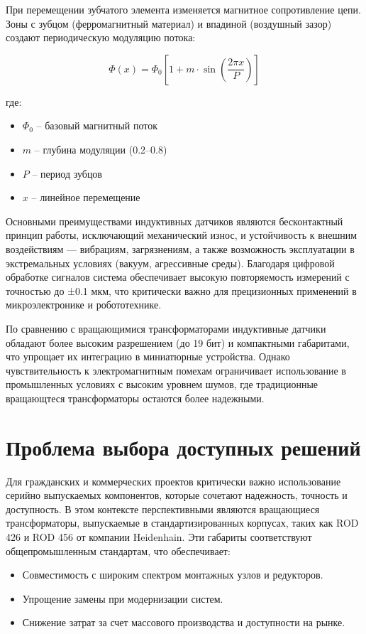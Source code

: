 При перемещении зубчатого элемента изменяется магнитное сопротивление цепи. Зоны с зубцом (ферромагнитный материал) и впадиной (воздушный зазор) создают периодическую модуляцию потока:

\begin{equation}
    \Phi(x) = \Phi_0 \left[ 1 + m \cdot \sin\left(\frac{2\pi x}{P}\right) \right]
\end{equation}

где:
\begin{itemize}
    \item $\Phi_0$ -- базовый магнитный поток
    \item $m$ -- глубина модуляции (0.2–0.8)
    \item $P$ -- период зубцов
    \item $x$ -- линейное перемещение
\end{itemize}

Основными преимуществами индуктивных датчиков являются бесконтактный принцип работы, исключающий механический износ, и устойчивость к внешним воздействиям — вибрациям, загрязнениям, 
а также возможность эксплуатации в экстремальных условиях (вакуум, агрессивные среды). Благодаря цифровой обработке сигналов система обеспечивает высокую повторяемость измерений 
с точностью до ±0.1 мкм, что критически важно для прецизионных применений в микроэлектронике и робототехнике.

По сравнению с вращающимися трансформаторами индуктивные датчики обладают более высоким разрешением (до 19 бит) и компактными габаритами, что упрощает их интеграцию в миниатюрные устройства. 
Однако  чувствительность к электромагнитным помехам ограничивает использование в промышленных условиях с высоким уровнем шумов, где традиционные вращающтеся трансформаторы 
остаются более надежными.

\section{Проблема выбора доступных решений}
Для гражданских и коммерческих проектов критически важно использование серийно выпускаемых компонентов, которые сочетают надежность, точность и доступность. 
В этом контексте перспективными являются вращающиеся трансформаторы, выпускаемые в стандартизированных корпусах, таких как ROD 426 и ROD 456 от компании Heidenhain. 
Эти габариты соответствуют общепромышленным стандартам, что обеспечивает:

\begin{itemize} 
  \item Совместимость с широким спектром монтажных узлов и редукторов.
  \item Упрощение замены при модернизации систем.
  \item Снижение затрат за счет массового производства и доступности на рынке.
\end{itemize}

